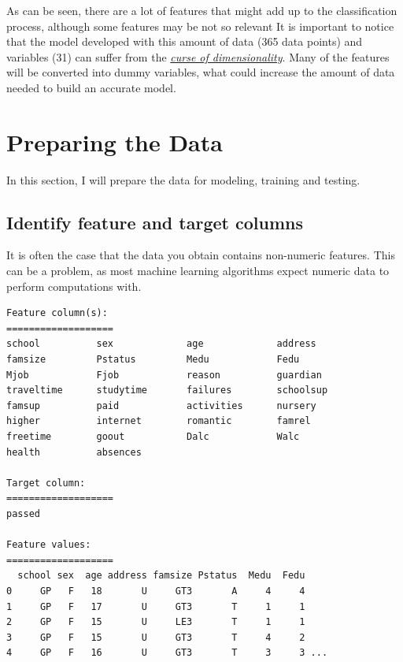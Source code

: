 \documentclass[a4paper]{article}
\begin{document}
As can be seen, there are a lot of features that might add up to the classification process, although some features may be not so relevant It is important to notice that the model developed with this amount of data (365 data points) and variables (31) can suffer from the  \href{https://en.wikipedia.org/wiki/Curse_of_dimensionality}{\textit{curse of dimensionality}}. Many of the features will be converted into dummy variables, what could increase the amount of data needed to build an accurate model.


\section{Preparing the Data}
In this section, I will prepare the data for modeling, training and testing.
\subsection{Identify feature and target columns}
It is often the case that the data you obtain contains non-numeric features. This can be a problem, as most machine learning algorithms expect numeric data to perform computations with.

\begin{lstlisting}
Feature column(s):
===================
school         	sex            	age            	address        
famsize        	Pstatus        	Medu           	Fedu           
Mjob           	Fjob           	reason         	guardian       
traveltime     	studytime      	failures       	schoolsup      
famsup         	paid           	activities     	nursery        
higher         	internet       	romantic       	famrel         
freetime       	goout          	Dalc           	Walc           
health         	absences       

Target column:
===================
passed

Feature values:
===================
  school sex  age address famsize Pstatus  Medu  Fedu
0     GP   F   18       U     GT3       A     4     4
1     GP   F   17       U     GT3       T     1     1
2     GP   F   15       U     LE3       T     1     1
3     GP   F   15       U     GT3       T     4     2
4     GP   F   16       U     GT3       T     3     3 ...
\end{lstlisting}
\end{document}
